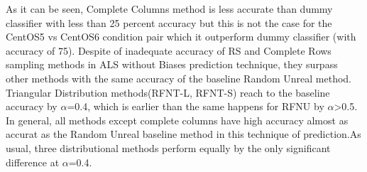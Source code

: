 \documentclass[10pt, conference, compsocconf]{IEEEtran}
\begin{document}
As it can be seen, Complete Columns method is less accurate than dummy classifier
 with less than 25 percent accuracy but this is not the case for the CentOS5 vs CentOS6 
 condition pair which it outperform dummy classifier (with accuracy of 75).
Despite of inadequate accuracy of RS and Complete Rows sampling methods in ALS without Biases prediction technique,
 they surpass other methods with the same accuracy of the baseline Random Unreal method.
Triangular Distribution methods(RFNT-L, RFNT-S) reach to the baseline accuracy by $\alpha$=0.4, 
which is earlier than the same happens for RFNU  by $\alpha$>0.5.{}
In general, all methods except complete columns have high accuracy almost as accurat as the Random Unreal baseline method
in this technique of prediction.As usual, three distributional methods perform equally by the only significant 
difference at $\alpha$=0.4{}.  


 
\end{document}
